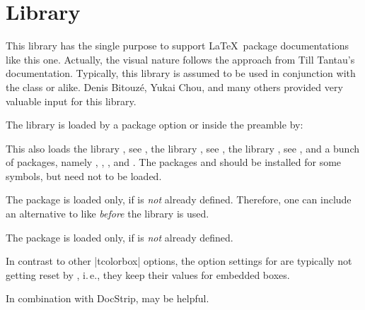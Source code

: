 \clearpage
\section{Library }\label{sec:documentation}%
%
This library has the single purpose to support \LaTeX\ package documentations
like this one. Actually, the visual nature follows the approach from
Till Tantau's  \cite{tantau:tikz_and_pgf} documentation.
Typically, this library is assumed to be used in conjunction with the
class  or alike.
Denis Bitouz\'e, Yukai Chou, and many others provided very valuable input for this library.

The library is loaded by a package option or inside the preamble by:
\begin{dispListing}
\end{dispListing}
This also loads
the library , see ,
the library , see ,
the library , see ,
and a bunch of packages, namely
, , , and .
The packages  and  should be installed for some symbols, but
need not to be loaded.

\begin{marker}
The package  is loaded only, if  is
\emph{not} already defined. Therefore, one can include an alternative to  like
 \emph{before} the library  is used.
\end{marker}
\begin{marker}
The package  is loaded only, if  is
\emph{not} already defined.
\end{marker}
\begin{marker}
In contrast to other |tcolorbox| options, the option
settings for  are typically not
getting reset by , i.\,e., they keep their
values for embedded boxes.
\end{marker}
\begin{marker}
In combination with DocStrip,  may be helpful.
\end{marker}

